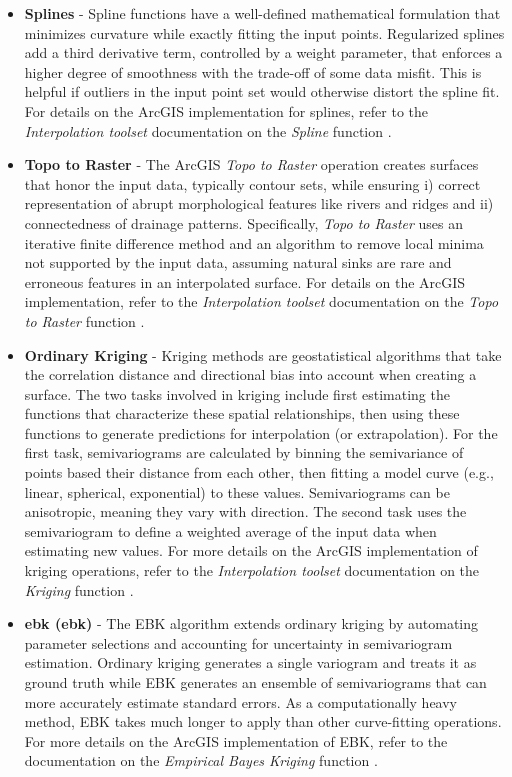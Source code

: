 \begin{itemize}
\item{\textbf{Splines}}\label{ch3:splines} - Spline functions have a well-defined mathematical formulation that minimizes curvature while exactly fitting the input points. Regularized splines add a third derivative term, controlled by a weight parameter, that enforces a higher degree of smoothness with the trade-off of some data misfit. This is helpful if outliers in the input point set would otherwise distort the spline fit. For details on the ArcGIS implementation for splines, refer to the \textit{Interpolation toolset} documentation on the \textit{Spline} function \citep{esri_spline_2021}.

\item{\textbf{Topo to Raster}}\label{ch3:topo2r} - The ArcGIS \textit{Topo to Raster} operation creates surfaces that honor the input data, typically contour sets, while ensuring i) correct representation of abrupt morphological features like rivers and ridges and ii) connectedness of drainage patterns. Specifically, \textit{Topo to Raster} uses an iterative finite difference method and an algorithm to remove local minima not supported by the input data, assuming natural sinks are rare and erroneous features in an interpolated surface. For details on the ArcGIS implementation, refer to the \textit{Interpolation toolset} documentation on the \textit{Topo to Raster} function \citep{esri_topo_2021}.

\item{\textbf{Ordinary Kriging}}\label{ch3:kriging} - Kriging methods are geostatistical algorithms that take the correlation distance and directional bias into account when creating a surface. The two tasks involved in kriging include first estimating the functions that characterize these spatial relationships, then using these functions to generate predictions for interpolation (or extrapolation). For the first task, semivariograms are calculated by binning the semivariance of points based their distance from each other, then fitting a model curve (e.g., linear, spherical, exponential) to these values. Semivariograms can be anisotropic, meaning they vary with direction. The second task uses the semivariogram to define a weighted average of the input data when estimating new values. For more details on the ArcGIS implementation of kriging operations, refer to the \textit{Interpolation toolset} documentation on the \textit{Kriging} function \citep{esri_kriging_2021}.

\item{\textbf{\acrlong{ebk} (\acrshort{ebk})}}\label{ch3:ebk} - The EBK algorithm extends ordinary kriging by automating parameter selections and accounting for uncertainty in semivariogram estimation. Ordinary kriging generates a single variogram and treats it as ground truth while EBK generates an ensemble of semivariograms that can more accurately estimate standard errors. As a computationally heavy method, EBK takes much longer to apply than other curve-fitting operations. For more details on the ArcGIS implementation of EBK, refer to the documentation on the \textit{Empirical Bayes Kriging} function \citep{esri_empirical_2021}.
\end{itemize}

